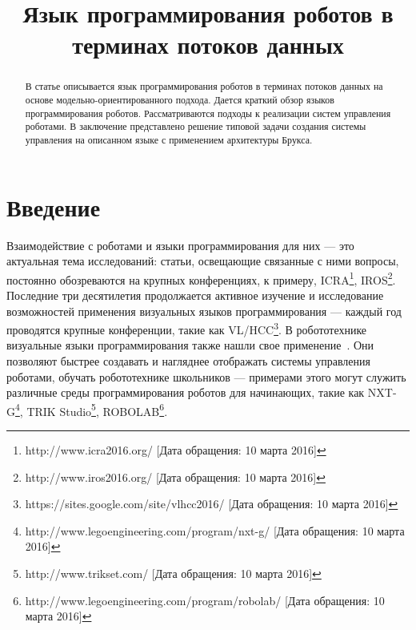 \documentclass[conference]{IEEEtran}
\begin{document}
\title{Язык программирования роботов в терминах потоков данных}

\author{
	
	\and

}

\maketitle


\begin{abstract}
В статье описывается язык программирования роботов в терминах потоков данных на основе модельно-ориентированного подхода. Дается краткий обзор языков программирования роботов. Рассматриваются подходы к реализации систем управления роботами. В заключение представлено решение типовой задачи создания системы управления на описанном языке с применением архитектуры Брукса. 
\end{abstract}

\section{Введение}
Взаимодействие с роботами и языки программирования для них --- это актуальная тема исследований: статьи, освещающие связанные с ними вопросы, постоянно обозреваются на крупных конференциях, к примеру, ICRA\footnote{http://www.icra2016.org/ [Дата обращения: 10 марта 2016]}, IROS\footnote{http://www.iros2016.org/ [Дата обращения: 10 марта 2016]}. Последние три десятилетия продолжается активное изучение и исследование возможностей применения  визуальных языков программирования --- каждый год проводятся крупные конференции, такие как VL/HCC\footnote{https://sites.google.com/site/vlhcc2016/ [Дата обращения: 10 марта 2016]}. В робототехнике визуальные языки программирования также нашли свое применение~\cite{banyasad2000visual,simpson2006mobile,simpson2008visual,posso2011process,diprose2011ruru}. Они позволяют быстрее создавать и нагляднее отображать системы управления роботами, обучать робототехнике школьников --- примерами этого могут служить различные среды программирования роботов для начинающих, такие как NXT-G\footnote{http://www.legoengineering.com/program/nxt-g/ [Дата обращения: 10 марта 2016]}, TRIK Studio\footnote{http://www.trikset.com/ [Дата обращения: 10 марта 2016]}, ROBOLAB\footnote{http://www.legoengineering.com/program/robolab/ [Дата обращения: 10 марта 2016]}. 
\end{document}
